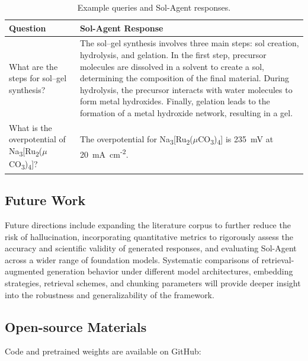 \begin{table}[h!]
\centering
\begin{tabular}{|p{4cm}|p{10cm}|}
\hline
\textbf{Question} & \textbf{Sol-Agent Response} \\
\hline
What are the steps for sol--gel synthesis?
&
The sol--gel synthesis involves three main steps: sol creation, hydrolysis, and gelation. In the first step, precursor molecules are dissolved in a solvent to create a sol, determining the composition of the final material. During hydrolysis, the precursor interacts with water molecules to form metal hydroxides. Finally, gelation leads to the formation of a metal hydroxide network, resulting in a gel. \\
\hline
What is the overpotential of Na\textsubscript{3}[Ru\textsubscript{2}(\(\mu\)CO\textsubscript{3})\textsubscript{4}]?
&
The overpotential for Na\textsubscript{3}[Ru\textsubscript{2}(\(\mu\)CO\textsubscript{3})\textsubscript{4}] is 235~mV at 20~mA~cm\textsuperscript{-2}. \\
\hline
\end{tabular}
\caption{Example queries and Sol-Agent responses.}
\label{tab:table_SolAgent}
\end{table}

\subsection*{Future Work}
Future directions include expanding the literature corpus to further reduce the risk of hallucination, incorporating quantitative metrics to rigorously assess the accuracy and scientific validity of generated responses, and evaluating Sol-Agent across a wider range of foundation models. Systematic comparisons of retrieval-augmented generation behavior under different model architectures, embedding strategies, retrieval schemes, and chunking parameters will provide deeper insight into the robustness and generalizability of the framework.

\subsection*{Open-source Materials}
Code and pretrained weights are available on GitHub: 


